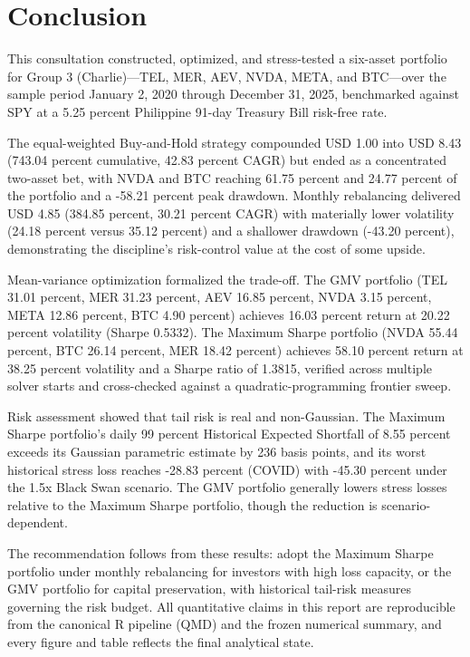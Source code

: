 \section{Conclusion}

This consultation constructed, optimized, and stress-tested a six-asset portfolio for Group 3 (Charlie)---TEL, MER, AEV, NVDA, META, and BTC---over the sample period January 2, 2020 through December 31, 2025, benchmarked against SPY at a 5.25 percent Philippine 91-day Treasury Bill risk-free rate.

The equal-weighted Buy-and-Hold strategy compounded USD 1.00 into USD 8.43 (743.04 percent cumulative, 42.83 percent CAGR) but ended as a concentrated two-asset bet, with NVDA and BTC reaching 61.75 percent and 24.77 percent of the portfolio and a -58.21 percent peak drawdown. Monthly rebalancing delivered USD 4.85 (384.85 percent, 30.21 percent CAGR) with materially lower volatility (24.18 percent versus 35.12 percent) and a shallower drawdown (-43.20 percent), demonstrating the discipline's risk-control value at the cost of some upside.

Mean-variance optimization formalized the trade-off. The GMV portfolio (TEL 31.01 percent, MER 31.23 percent, AEV 16.85 percent, NVDA 3.15 percent, META 12.86 percent, BTC 4.90 percent) achieves 16.03 percent return at 20.22 percent volatility (Sharpe 0.5332). The Maximum Sharpe portfolio (NVDA 55.44 percent, BTC 26.14 percent, MER 18.42 percent) achieves 58.10 percent return at 38.25 percent volatility and a Sharpe ratio of 1.3815, verified across multiple solver starts and cross-checked against a quadratic-programming frontier sweep.

Risk assessment showed that tail risk is real and non-Gaussian. The Maximum Sharpe portfolio's daily 99 percent Historical Expected Shortfall of 8.55 percent exceeds its Gaussian parametric estimate by 236 basis points, and its worst historical stress loss reaches -28.83 percent (COVID) with -45.30 percent under the 1.5x Black Swan scenario. The GMV portfolio generally lowers stress losses relative to the Maximum Sharpe portfolio, though the reduction is scenario-dependent.

The recommendation follows from these results: adopt the Maximum Sharpe portfolio under monthly rebalancing for investors with high loss capacity, or the GMV portfolio for capital preservation, with historical tail-risk measures governing the risk budget. All quantitative claims in this report are reproducible from the canonical R pipeline (QMD) and the frozen numerical summary, and every figure and table reflects the final analytical state.
